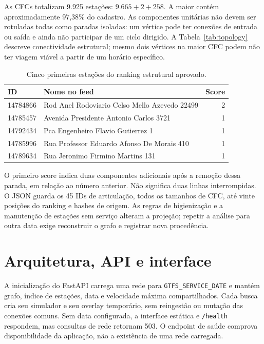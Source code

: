 \documentclass[12pt]{article}
\newcommand{\code}[1]{\texttt{#1}}
\begin{document}
As CFCs totalizam 9.925 estações: $9.665+2+258$. A maior contém aproximadamente 97,38\% do cadastro. As componentes unitárias não devem ser rotuladas todas como paradas isoladas: um vértice pode ter conexões de entrada ou saída e ainda não participar de um ciclo dirigido. A Tabela~\ref{tab:topology} descreve conectividade estrutural; mesmo dois vértices na maior CFC podem não ter viagem viável a partir de um horário específico.

\begin{table}[ht]
\centering
\caption{Cinco primeiras estações do ranking estrutural aprovado.}
\begin{tabularx}{\textwidth}{@{}lXr@{}}
\toprule ID & Nome no feed & Score \\
\midrule
14784866 & Rod Anel Rodoviario Celso Mello Azevedo 22499 & 2 \\
14785457 & Avenida Presidente Antonio Carlos 3721 & 1 \\
14792434 & Pca Engenheiro Flavio Gutierrez 1 & 1 \\
14785996 & Rua Professor Eduardo Afonso De Morais 410 & 1 \\
14789634 & Rua Jeronimo Firmino Martins 131 & 1 \\
\bottomrule
\end{tabularx}
\end{table}

O primeiro score indica duas componentes adicionais após a remoção dessa parada, em relação ao número anterior. Não significa duas linhas interrompidas. O JSON guarda os 45 IDs de articulação, todos os tamanhos de CFC, até vinte posições do ranking e hashes de origem. As regras de higienização e a manutenção de estações sem serviço alteram a projeção; repetir a análise para outra data exige reconstruir o grafo e registrar nova procedência.

\section{Arquitetura, API e interface}
A inicialização do FastAPI carrega uma rede para \code{GTFS\_SERVICE\_DATE} e mantém grafo, índice de estações, data e velocidade máxima compartilhados. Cada busca cria seu simulador e seu overlay temporário, sem reingestão ou mutação das conexões comuns. Sem data configurada, a interface estática e \code{/health} respondem, mas consultas de rede retornam 503. O endpoint de saúde comprova disponibilidade da aplicação, não a existência de uma rede carregada.
\end{document}
